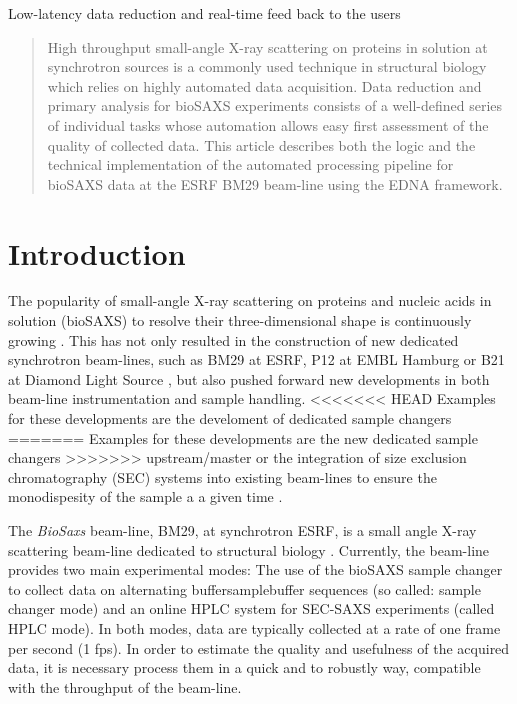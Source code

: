 \documentclass[preprint,pdf]{iucr}              %
\begin{document}
\maketitle                        %

\begin{synopsis}
Low-latency data reduction and real-time feed back to the users
\end{synopsis}

\begin{abstract}
High throughput small-angle X-ray scattering on proteins in solution at
synchrotron sources is a commonly used technique in structural biology which
relies on highly automated data acquisition.
Data reduction and primary analysis for bioSAXS experiments consists of a
well-defined series of individual tasks whose automation allows easy first
assessment of the quality of collected data.
This article describes both the logic and the technical implementation of the
automated processing pipeline for bioSAXS data at the ESRF BM29 beam-line using
the EDNA framework.
\end{abstract}


\section{Introduction}
The popularity of small-angle X-ray scattering on proteins and nucleic acids in
solution (bioSAXS) to resolve their three-dimensional shape is continuously
growing \cite{Graewert2013,Hura2009,Reyes2014}.
This has not only resulted in the construction of new dedicated
synchrotron beam-lines, such as BM29 at ESRF, P12 at EMBL Hamburg or B21 at
Diamond Light Source \cite{BM29paper,P12,B21}, but also pushed forward new
developments in both beam-line instrumentation and sample handling.
<<<<<<< HEAD
Examples for these developments are the develoment of dedicated sample changers
=======
Examples for these developments are the new dedicated sample changers
>>>>>>> upstream/master
\cite{SCPaper} or the integration of size exclusion chromatography (SEC) systems
into existing beam-lines to ensure the monodispesity of the sample a a given
time \cite{SECPaper2012}.

The \textit{BioSaxs} beam-line, BM29, at synchrotron ESRF, is a small angle
X-ray scattering beam-line dedicated to structural biology \cite{BM29paper}.
Currently, the beam-line provides two main experimental modes: The use of the
bioSAXS sample changer to collect data on alternating buffer\/sample\/buffer
sequences (so called: sample changer mode) and an online HPLC system for
SEC-SAXS experiments (called HPLC mode).
In both modes, data are typically collected at a rate of one frame per second
(1 fps).
In order to estimate the quality and usefulness of the acquired data, it is
necessary process them in a quick and to robustly way, compatible with the
throughput of the beam-line.
\end{document}
